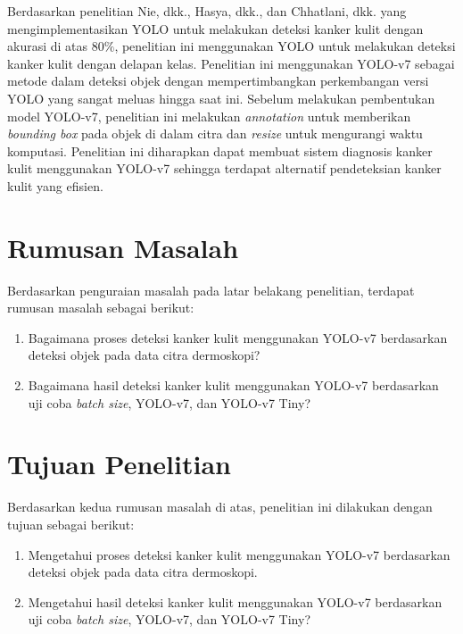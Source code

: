     Berdasarkan penelitian Nie, dkk., Hasya, dkk., dan Chhatlani, dkk. yang mengimplementasikan YOLO untuk melakukan deteksi kanker kulit dengan akurasi di atas $80\%$, penelitian ini menggunakan YOLO untuk melakukan deteksi kanker kulit dengan delapan kelas. Penelitian ini menggunakan YOLO-v7 sebagai metode dalam deteksi objek dengan mempertimbangkan perkembangan versi YOLO yang sangat meluas hingga saat ini. Sebelum melakukan pembentukan model YOLO-v7, penelitian ini melakukan \textit{annotation} untuk memberikan \textit{bounding box} pada objek di dalam citra dan \textit{resize} untuk mengurangi waktu komputasi. Penelitian ini diharapkan dapat membuat sistem diagnosis kanker kulit menggunakan YOLO-v7 sehingga terdapat alternatif pendeteksian kanker kulit yang efisien.

    \section{Rumusan Masalah}
    Berdasarkan penguraian masalah pada latar belakang penelitian, terdapat rumusan masalah sebagai berikut:
    \begin{enumerate}
        \item Bagaimana proses deteksi kanker kulit menggunakan YOLO-v7 berdasarkan deteksi objek pada data citra dermoskopi?
        \item Bagaimana hasil deteksi kanker kulit menggunakan YOLO-v7 berdasarkan uji coba \textit{batch size}, YOLO-v7, dan YOLO-v7 Tiny?
    \end{enumerate}

    \section{Tujuan Penelitian}
    Berdasarkan kedua rumusan masalah di atas, penelitian ini dilakukan dengan tujuan sebagai berikut:
    \begin{enumerate}
        \item Mengetahui proses deteksi kanker kulit menggunakan YOLO-v7 berdasarkan deteksi objek pada data citra dermoskopi.
        \item Mengetahui hasil deteksi kanker kulit menggunakan YOLO-v7 berdasarkan uji coba \textit{batch size}, YOLO-v7, dan YOLO-v7 Tiny?
    \end{enumerate}

